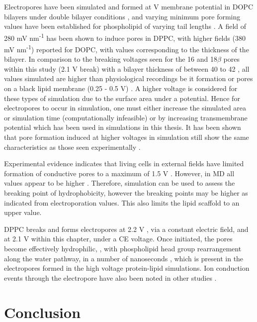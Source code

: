 Electropores have been simulated and formed at  V membrane potential in DOPC bilayers under double bilayer conditions \cite{Vernier2006a}, and varying minimum pore forming values have been established for phospholipid of varying tail lengths \cite{Vernier2007}. A field of 280 mV nm\textsuperscript{-1} has been shown to induce pores in DPPC, with higher fields (380 mV nm\textsuperscript{-1}) reported for DOPC, with values corresponding to the thickness of the bilayer. In comparison to the breaking voltages seen for the 16 and 18$\beta$ pores within this study (2.1 V break) with a bilayer thickness of between 40 to 42 \angstrom, all values simulated are higher than physiological recordings be it formation or pores on a black lipid membrane (0.25 - 0.5 V) \cite{Melikov2001}. A higher voltage is considered for these types of simulation due to the surface area under a potential. Hence for electropores to occur in simulation, one must either increase the simulated area or simulation time (computationally infeasible) or by increasing transmembrane potential \cite{Chernomordik1983,Nuccitelli2006,Weaver1981} which has been used in simulations in this thesis. It has been shown that pore formation induced at higher voltages in simulation still show the same characteristics as those seen experimentally \cite{Tieleman2004}. 

Experimental evidence indicates that living cells in external fields have limited formation of conductive pores to a maximum of 1.5 V \cite{Frey2006,Marszalek1990,Tanaka1986}. However, in MD all values appear to be higher \cite{Gurtovenko2005,Tarek2005,Tieleman2004,Vernier2006,Polak2013a}. Therefore, simulation can be used to assess the breaking point of hydrophobicity, however the breaking points may be higher as indicated from electroporation values. This also limits the lipid scaffold to an upper value. 

DPPC breaks and forms electropores at 2.2 V \cite{Polak2013}, via a constant electric field, and at 2.1 V within this chapter, under a CE voltage. Once initiated, the pores become effectively hydrophilic, \cite{Abiror1979,Glaser1988}, with phospholipid head group rearrangement along the water pathway, in a number of nanoseconds \cite{Sugar1984,Weaver1984x}, which is present in the electropores formed in the high voltage protein-lipid simulations. Ion conduction events through the electropore have also been noted in other studies \cite{Vernier2006a}. 

\section{Conclusion}

